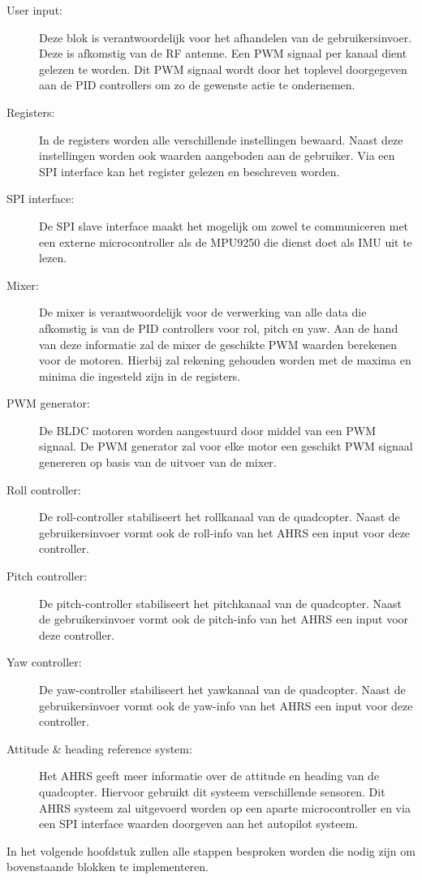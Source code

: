 				\begin{description}

					\item[User input:] Deze blok is verantwoordelijk voor het afhandelen van de gebruikersinvoer. Deze is afkomstig van de RF antenne. Een PWM signaal per kanaal dient gelezen te worden. Dit PWM signaal wordt door het toplevel doorgegeven aan de PID controllers om zo de gewenste actie te ondernemen.

					\item[Registers:] In de registers worden alle verschillende instellingen bewaard. Naast deze instellingen worden ook waarden aangeboden aan de gebruiker. Via een SPI interface kan het register gelezen en beschreven worden.

					\item[SPI interface:] De SPI slave interface maakt het mogelijk om zowel te communiceren met een externe microcontroller als de MPU9250 die dienst doet als IMU uit te lezen.

					\item[Mixer:] De mixer is verantwoordelijk voor de verwerking van alle data die afkomstig is van de PID controllers voor rol, pitch en yaw. Aan de hand van deze informatie zal de mixer de geschikte PWM waarden berekenen voor de motoren. Hierbij zal rekening gehouden worden met de maxima en minima die ingesteld zijn in de registers.

					\item[PWM generator:]  De BLDC motoren worden aangestuurd door middel van een PWM signaal. De PWM generator zal voor elke motor een geschikt PWM signaal genereren op basis van de uitvoer van de mixer.

					\item[Roll controller:] De roll-controller stabiliseert het rollkanaal van de quadcopter. Naast de gebruikersinvoer vormt ook de roll-info van het AHRS een input voor deze controller.

					\item[Pitch controller:] De pitch-controller stabiliseert het pitchkanaal van de quadcopter. Naast de gebruikersinvoer vormt ook de pitch-info van het AHRS een input voor deze controller.

					\item[Yaw controller:]De yaw-controller stabiliseert het yawkanaal van de quadcopter. Naast de gebruikersinvoer vormt ook de yaw-info van het AHRS een input voor deze controller.

					\item[Attitude \& heading reference system:] Het AHRS geeft meer informatie over de attitude en heading van de quadcopter. Hiervoor gebruikt dit systeem verschillende sensoren. Dit AHRS systeem zal uitgevoerd worden op een aparte microcontroller en via een SPI interface waarden doorgeven aan het autopilot systeem.

				\end{description}

			\par In het volgende hoofdstuk zullen alle stappen besproken worden die nodig zijn om bovenstaande blokken te implementeren.
